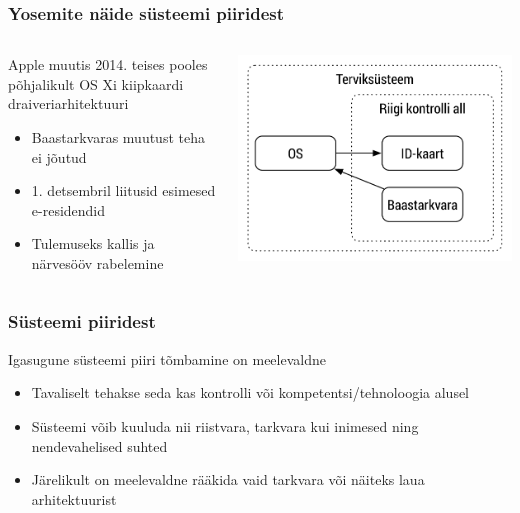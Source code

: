 \begin{frame}[label=Yosemite]
	\frametitle{Yosemite näide süsteemi piiridest}
	\begin{columns}[t]
		\begin{column}{6.5cm}
			Apple muutis 2014. teises pooles põhjalikult OS Xi kiipkaardi draiveriarhitektuuri
			\begin{itemize}
				\item Baastarkvaras muutust teha ei jõutud 
				\item 1. detsembril liitusid esimesed e-residendid
				\item Tulemuseks kallis ja närvesööv rabelemine
			\end{itemize}
		\end{column}
		\begin{column}[T]{4.5cm}
			\includegraphics[width=\textwidth]{yosemite.pdf}
		\end{column}
	\end{columns}
\end{frame}


\begin{frame}[fragile]
  \frametitle{Süsteemi piiridest}
		Igasugune süsteemi piiri tõmbamine on meelevaldne
		\begin{itemize}
			\item Tavaliselt tehakse seda kas kontrolli või kompetentsi/tehnoloogia alusel
			\item Süsteemi võib kuuluda nii riistvara, tarkvara kui inimesed ning nendevahelised suhted
			\item Järelikult on meelevaldne rääkida vaid tarkvara või näiteks laua arhitektuurist
		\end{itemize}

\end{frame}

